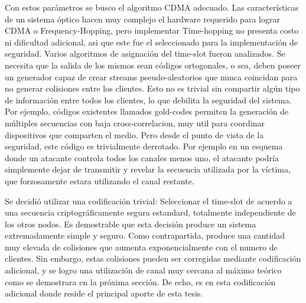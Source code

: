Con estos parámetros se busco el algoritmo CDMA adecuado. Las características de un sistema óptico hacen muy complejo el hardware requerido para lograr CDMA o Frequency-Hopping, pero implementar Time-hopping no presenta costo ni dificultad adicional, asi que este fue el seleccionado para la implementación de seguridad.
Varios algoritmos de asignación del time-slot fueron analizados. Se necesita que la salida de los mismos sean códigos ortogonales, o sea, deben poseer un generador capaz de crear streams pseudo-aleatorios que nunca coincidan para no generar colisiones entre los clientes. Esto no es trivial sin compartir algún tipo de información entre todos los clientes, lo que debilita la seguridad del sistema. Por ejemplo, códigos existentes llamados gold-codes permiten la generación de múltiples secuencias con baja cross-correlacion, muy util para coordinar dispositivos que comparten el medio. Pero desde el punto de vista de la seguridad, este código es trivialmente derrotado. Por ejemplo en un esquema donde un atacante controla todos los canales menos uno, el atacante podría simplemente dejar de transmitir y revelar la secuencia utilizada por la víctima, que forzosamente estara utilizando el canal restante.

Se decidió utilizar una codificación trivial: Seleccionar el time-slot de acuerdo a una secuencia criptográficamente segura estandard, totalmente independiente de los otros nodos. Es demostrable que esta decisión produce un sistema extremadamente simple y seguro. Como contrapartida, produce una cantidad muy elevada de colisiones que aumenta exponencialmente con el numero de clientes. Sin embargo, estas colisiones pueden ser corregidas mediante codificación adicional, y se logro una utilización de canal muy cercana al máximo teórico como se demostrara en la próxima sección. De echo, es en esta codificación adicional donde reside el principal aporte de esta tesis.

